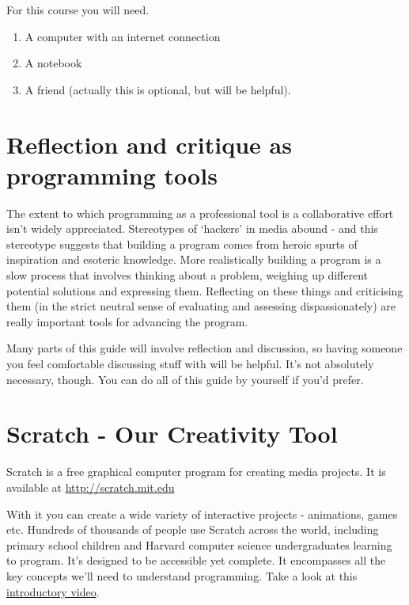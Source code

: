 \documentclass[]{book}
\providecommand{\tightlist}{%
  \setlength{\itemsep}{0pt}\setlength{\parskip}{0pt}}
\begin{document}
For this course you will need.

\begin{enumerate}
\def\labelenumi{\arabic{enumi}.}
\tightlist
\item
  A computer with an internet connection
\item
  A notebook
\item
  A friend (actually this is optional, but will be helpful).
\end{enumerate}

\hypertarget{reflection-and-critique-as-programming-tools}{%
\section{Reflection and critique as programming
tools}\label{reflection-and-critique-as-programming-tools}}

The extent to which programming as a professional tool is a
collaborative effort isn't widely appreciated. Stereotypes of `hackers'
in media abound - and this stereotype suggests that building a program
comes from heroic spurts of inspiration and esoteric knowledge. More
realistically building a program is a slow process that involves
thinking about a problem, weighing up different potential solutions and
expressing them. Reflecting on these things and criticising them (in the
strict neutral sense of evaluating and assessing dispassionately) are
really important tools for advancing the program.

Many parts of this guide will involve reflection and discussion, so
having someone you feel comfortable discussing stuff with will be
helpful. It's not absolutely necessary, though. You can do all of this
guide by yourself if you'd prefer.

\hypertarget{scratch---our-creativity-tool}{%
\section{Scratch - Our Creativity
Tool}\label{scratch---our-creativity-tool}}

Scratch is a free graphical computer program for creating media
projects. It is available at \url{http://scratch.mit.edu}

With it you can create a wide variety of interactive projects -
animations, games etc. Hundreds of thousands of people use Scratch
across the world, including primary school children and Harvard computer
science undergraduates learning to program. It's designed to be
accessible yet complete. It encompasses all the key concepts we'll need
to understand programming. Take a look at this
\href{https://vimeo.com/65583694}{introductory video}.
\end{document}
